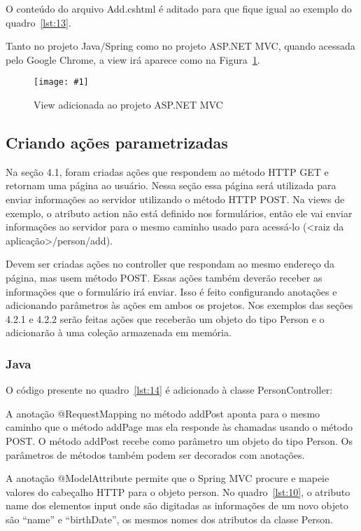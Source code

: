 \documentclass[a4paper,12pt]{article}
\newcommand{\figura}[3] {
	\begin{figure}[ht]
		\centering
		\texttt{[image: \#1]}
		\caption{#2}
		\label{#3}
	\end{figure}
	\FloatBarrier
}
\newcommand{\javacode}[3] {
	
	\FloatBarrier
}
\newcommand{\razorcode}[3] {
	
	\FloatBarrier
}
\begin{document}
O conteúdo do arquivo Add.cshtml é aditado para que fique igual ao exemplo do quadro~\ref{lst:13}.

\razorcode{code/13.txt}{O arquivo Add.cshtml}{lst:13}

Tanto no projeto Java/Spring como no projeto ASP.NET MVC, quando acessada pelo Google Chrome, a view irá aparece como na Figura~\ref{fig:28}. 

\figura{28.png}{View adicionada ao projeto ASP.NET MVC}{fig:28}

\subsection{Criando ações parametrizadas}

Na seção 4.1, foram criadas ações que respondem ao método HTTP GET e retornam uma página ao usuário. Nessa seção essa página será utilizada para enviar informações ao servidor utilizando o método HTTP POST. Na views de exemplo, o atributo action não está definido nos formulários, então ele vai enviar informações ao servidor para o mesmo caminho usado para acessá-lo (<raiz da aplicação>/person/add).

Devem ser criadas ações no controller que respondam ao mesmo endereço da página, mas usem método POST. Essas ações também deverão receber as informações que o formulário irá enviar. Isso é feito configurando anotações e adicionando parâmetros às ações em ambos os projetos. Nos exemplos das seções 4.2.1 e 4.2.2 serão feitas ações que receberão um objeto do tipo Person e o adicionarão à uma coleção armazenada em memória.

\subsubsection{Java}

O código presente no quadro~\ref{lst:14} é adicionado à classe PersonController:

\javacode{code/14.txt}{Ação de PersonController no projeto Java que responde ao método POST}{lst:14}

A anotação @RequestMapping no método addPost aponta para o mesmo caminho que o método addPage mas ela responde às chamadas usando o método POST. O método addPost recebe como parâmetro um objeto do tipo Person. Os parâmetros de métodos também podem ser decorados com anotações.

A anotação @ModelAttribute permite que o Spring MVC procure e mapeie valores do cabeçalho HTTP para o objeto person. No quadro~\ref{lst:10}, o atributo name dos elementos input onde são digitadas as informações de um novo objeto são “name” e “birthDate”, os mesmos nomes dos atributos da classe Person.
\end{document}
